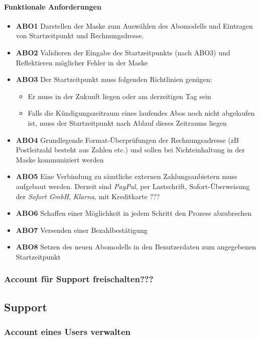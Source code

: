 \paragraph{Funktionale Anforderungen}
\begin{itemize}
	\item \textbf{ABO1} Darstellen der Maske zum Auswählen des Abomodells und Eintragen von Startzeitpunkt und Rechnungsdresse.
	\item \textbf{ABO2} Validieren der Eingabe des Startzeitpunkts (nach ABO3) und Reflektieren möglicher Fehler in der Maske
	\item \textbf{ABO3} Der Startzeitpunkt muss folgenden Richtlinien genügen:
	      \begin{itemize}
		      \item Er muss in der Zukunft liegen oder am derzeitigen Tag sein
		      \item Falls die Kündigungszeitraum eines laufendes Abos noch nicht abgelaufen ist, muss der Startzeitpunkt nach Ablauf dieses Zeitraums liegen
	      \end{itemize}
	\item \textbf{ABO4} Grundlegende Format-Überprüfungen der Rechnungsadresse (zB Postleitzahl besteht aus Zahlen etc.) und sollen bei Nichteinhaltung in der Maske kommuniziert werden
	\item \textbf{ABO5} Eine Verbindung zu sämtliche externen Zahlungsanbietern muss aufgebaut werden. Derzeit sind \textit{PayPal}, per Lastschrift, Sofort-Überweisung der \textit{Sofort GmbH}, \textit{Klarna}, mit Kreditkarte ???
	\item \textbf{ABO6} Schaffen einer Möglichkeit in jedem Schritt den Prozess abzubrechen
	\item \textbf{ABO7} Versenden einer Bezahlbestätigung
	\item \textbf{ABO8} Setzen des neuen Abomodells in den Benutzerdaten zum angegebenen Startzeitpunkt
\end{itemize}

\subsubsection{Account für Support freischalten???} \label{sys_feat:freischalten}


\subsection{Support}
\subsubsection{Account eines Users verwalten}
